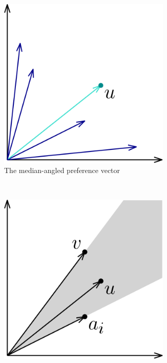 \documentclass[12pt]{article}
\newcommand{\1}[1]{\mathds{1}[{#1}]}
\begin{document}
  \begin{figure}[h]
    \centering
    \begin{subfigure}[t]{0.3\textwidth}
      \includegraphics[width=0.9\textwidth]{figures/defMedianAngle}
      \caption{The median-angled preference vector}
      \label{fig:gull}
    \end{subfigure}
    ~
    \begin{subfigure}[t]{0.3\textwidth}
      \includegraphics[width=0.9\textwidth]{figures/thrmIncentiveComp}

\end{subfigure}
\end{figure}
\end{document}
